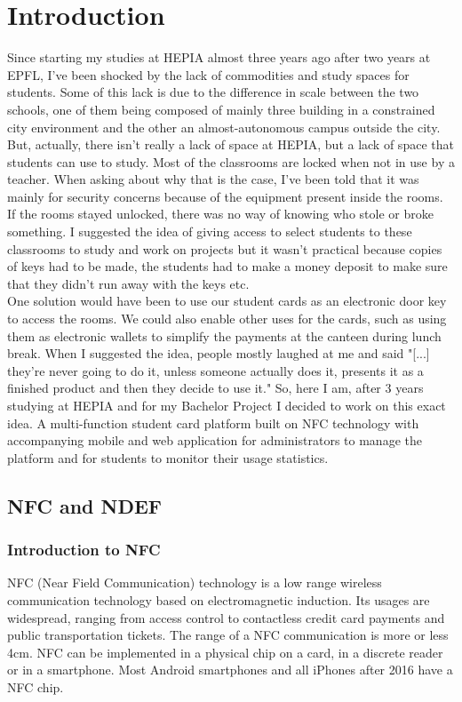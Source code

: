 \documentclass[11pt,a4paper]{report}
\begin{document}
\chapter{Introduction}
Since starting my studies at HEPIA almost three years ago after two years at EPFL, I've been shocked by the lack of commodities and study spaces for students. Some of this lack is due to the difference in scale between the two schools, one of them being composed of mainly three building in a constrained city environment and the other an almost-autonomous campus outside the city. But, actually, there isn't really a lack of space at HEPIA, but a lack of space that students can use to study. Most of the classrooms are locked when not in use by a teacher. When asking about why that is the case, I've been told that it was mainly for security concerns because of the equipment present inside the rooms. If the rooms stayed unlocked, there was no way of knowing who stole or broke something. I suggested the idea of giving access to select students to these classrooms to study and work on projects but it wasn't practical because copies of keys had to be made, the students had to make a money deposit to make sure that they didn't run away with the keys etc.\\ 

One solution would have been to use our student cards as an electronic door key to access the rooms. We could also enable other uses for the cards, such as using them as electronic wallets to simplify the payments at the canteen during lunch break. When I suggested the idea, people mostly laughed at me and said "[...] they're never going to do it, unless someone actually does it, presents it as a finished product and then they decide to use it." So, here I am, after 3 years studying at HEPIA and for my Bachelor Project I decided to work on this exact idea. A multi-function student card platform built on NFC technology with accompanying mobile and web application for administrators to manage the platform and for students to monitor their usage statistics.


\section{NFC and NDEF}
\subsection{Introduction to NFC}
NFC (Near Field Communication) technology is a low range wireless communication technology based on electromagnetic induction. Its usages are widespread, ranging from access control to contactless credit card payments and public transportation tickets. The range of a NFC communication is more or less 4cm. NFC can be implemented in a physical chip on a card, in a discrete reader or in a smartphone. Most Android smartphones and all iPhones after 2016 have a NFC chip. \\
\end{document}
